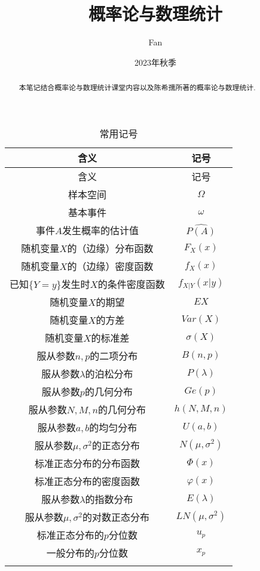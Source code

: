 \documentclass[a4paper,11pt]{article}%
\author{Fan}
\title{概率论与数理统计}
\date{2023年秋季}
\theoremstyle{remark}
\theoremstyle{remark}
\theoremstyle{definition}
\theoremstyle{definition}
\theoremstyle{plain}
\begin{document}
\maketitle
\tableofcontents
\begin{abstract}
    本笔记结合概率论与数理统计课堂内容以及陈希孺所著的概率论与数理统计.
\end{abstract}
\printindex
\pagestyle{plain}%
\begin{longtable}{cc}
       \multicolumn{1}{c}{含义}&\multicolumn{1}{c}{记号}\\
       \hline
       \endfirsthead
       \multicolumn{1}{c}{含义}&\multicolumn{1}{c}{记号}\\
       \hline\endhead
        样本空间&$\Omega$\\
        基本事件&$\omega$\\
        事件$A$发生概率的估计值&$\widehat{P(A)}$\\
        随机变量$X$的（边缘）分布函数&$F_X(x)$\\ 
        随机变量$X$的（边缘）密度函数&$f_X(x)$\\ 
        已知$\{Y=y\}$发生时$X$的条件密度函数&$f_{X|Y}(x|y)$\\
        随机变量$X$的期望&$EX$\\
        随机变量$X$的方差&$Var(X)$\\
        随机变量$X$的标准差 &$\sigma(X)$\\
        服从参数$n,p$的二项分布&$B(n,p)$\\
        服从参数$\lambda$的泊松分布&$P(\lambda)$\\
        服从参数$p$的几何分布&$Ge(p)$\\
        服从参数$N,M,n$的几何分布&$h(N,M,n)$\\
        服从参数$a,b$的均匀分布&$U(a,b)$\\
        服从参数$\mu,\sigma^2$的正态分布&$N(\mu,\sigma^2)$\\
        标准正态分布的分布函数&$\Phi(x)$\\
        标准正态分布的密度函数&$\varphi(x)$\\
        服从参数$\lambda$的指数分布&$E(\lambda)$\\
        服从参数$\mu,\sigma^2$的对数正态分布&$LN(\mu,\sigma^2)$\\
        标准正态分布的$p$分位数&$u_p$\\
        一般分布的$p$分位数&$x_p$\\
       \caption{常用记号} \\
 \end{longtable}
\end{document}
